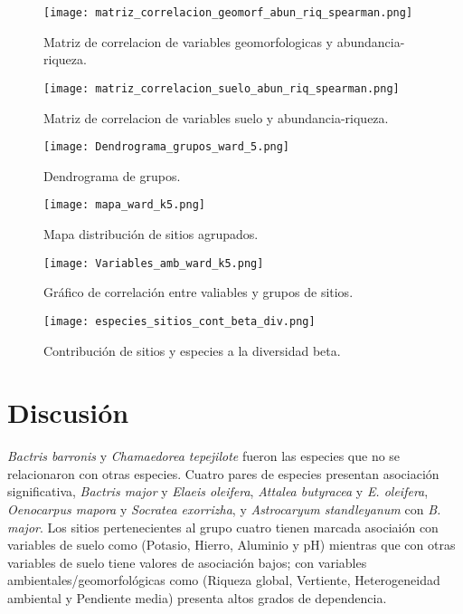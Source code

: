 \documentclass[11pt,]{article}
\begin{document}
\begin{figure}
\centering
\texttt{[image: matriz\_correlacion\_geomorf\_abun\_riq\_spearman.png]}
\caption{Matriz de correlacion de variables geomorfologicas y
abundancia-riqueza.
\label{fig:matriz_correlacion_geomorf_abun_riq_spearman}}
\end{figure}

\begin{figure}
\centering
\texttt{[image: matriz\_correlacion\_suelo\_abun\_riq\_spearman.png]}
\caption{Matriz de correlacion de variables suelo y abundancia-riqueza.
\label{fig:matriz_correlacion_suelo_abun_riq_spearman}}
\end{figure}

\begin{figure}
\centering
\texttt{[image: Dendrograma\_grupos\_ward\_5.png]}
\caption{Dendrograma de grupos. \label{fig:Dendrograma_grupos_ward_5}}
\end{figure}

\begin{figure}
\centering
\texttt{[image: mapa\_ward\_k5.png]}
\caption{Mapa distribución de sitios agrupados.
\label{fig:mapa_ward_k5}}
\end{figure}

\begin{figure}
\centering
\texttt{[image: Variables\_amb\_ward\_k5.png]}
\caption{Gráfico de correlación entre valiables y grupos de sitios.
\label{fig:Variables_amb_ward_k5}}
\end{figure}

\begin{figure}
\centering
\texttt{[image: especies\_sitios\_cont\_beta\_div.png]}
\caption{Contribución de sitios y especies a la diversidad beta.
\label{fig:especies_sitios_cont_beta_div}}
\end{figure}

\section{Discusión}\label{discusiuxf3n}

\emph{Bactris barronis} y \emph{Chamaedorea tepejilote} fueron las
especies que no se relacionaron con otras especies. Cuatro pares de
especies presentan asociación significativa, \emph{Bactris major} y
\emph{Elaeis oleifera}, \emph{Attalea butyracea} y \emph{E. oleifera},
\emph{Oenocarpus mapora} y \emph{Socratea exorrizha}, y
\emph{Astrocaryum standleyanum} con \emph{B. major}. Los sitios
pertenecientes al grupo cuatro tienen marcada asociaión con variables de
suelo como (Potasio, Hierro, Aluminio y pH) mientras que con otras
variables de suelo tiene valores de asociación bajos; con variables
ambientales/geomorfológicas como (Riqueza global, Vertiente,
Heterogeneidad ambiental y Pendiente media) presenta altos grados de
dependencia.
\end{document}
